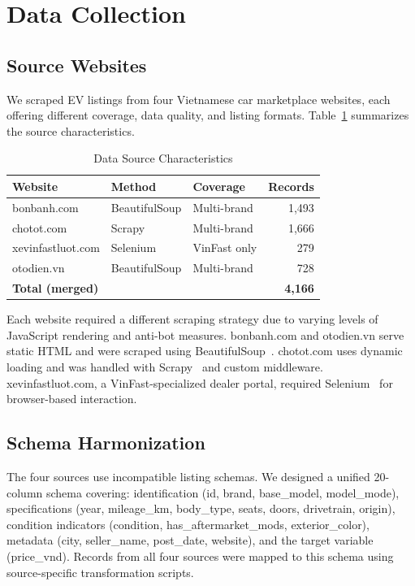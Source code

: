 \documentclass[lettersize,journal]{IEEEtran}
\begin{document}
\section{Data Collection}

\subsection{Source Websites}
We scraped EV listings from four Vietnamese car marketplace websites, each
offering different coverage, data quality, and listing formats. Table~\ref{tab:sources}
summarizes the source characteristics.

\begin{table}[!t]
\caption{Data Source Characteristics\label{tab:sources}}
\centering
\begin{tabular}{lllr}
\toprule
\textbf{Website} & \textbf{Method} & \textbf{Coverage} & \textbf{Records} \\
\midrule
bonbanh.com & BeautifulSoup & Multi-brand & 1,493 \\
chotot.com & Scrapy & Multi-brand & 1,666 \\
xevinfastluot.com & Selenium & VinFast only & 279 \\
otodien.vn & BeautifulSoup & Multi-brand & 728 \\
\midrule
\multicolumn{3}{l}{\textbf{Total (merged)}} & \textbf{4,166} \\
\bottomrule
\end{tabular}
\end{table}

Each website required a different scraping strategy due to varying levels of
JavaScript rendering and anti-bot measures. bonbanh.com and otodien.vn serve
static HTML and were scraped using BeautifulSoup~\cite{bs4}. chotot.com
uses dynamic loading and was handled with Scrapy~\cite{scrapy} and custom
middleware. xevinfastluot.com, a VinFast-specialized dealer portal, required
Selenium~\cite{selenium} for browser-based interaction.

\subsection{Schema Harmonization}
The four sources use incompatible listing schemas. We designed a unified
20-column schema covering: identification (id, brand, base\_model,
model\_mode), specifications (year, mileage\_km, body\_type, seats, doors,
drivetrain, origin), condition indicators (condition, has\_aftermarket\_mods,
exterior\_color), metadata (city, seller\_name, post\_date, website), and the
target variable (price\_vnd). Records from all four sources were mapped to
this schema using source-specific transformation scripts.
\end{document}
